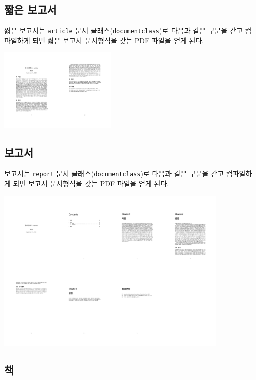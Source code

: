 \documentclass[
  letterpaper,
]{book}
\begin{document}
\hypertarget{uxc9e7uxc740-uxbcf4uxace0uxc11c}{%
\subsection{짧은 보고서}\label{uxc9e7uxc740-uxbcf4uxace0uxc11c}}

짧은 보고서는 \texttt{article} 문서 클래스(\texttt{documentclass})로
다음과 같은 구문을 갇고 컴파일하게 되면 짧은 보고서 문서형식을 갖는 PDF
파일을 얻게 된다.

\includegraphics[width=2.21in,height=\textheight]{document_class_files/figure-pdf/unnamed-chunk-2-1.png}

\hypertarget{uxbcf4uxace0uxc11c}{%
\subsection{보고서}\label{uxbcf4uxace0uxc11c}}

보고서는 \texttt{report} 문서 클래스(\texttt{documentclass})로 다음과
같은 구문을 갇고 컴파일하게 되면 보고서 문서형식을 갖는 PDF 파일을 얻게
된다.

\includegraphics[width=4.39in,height=\textheight]{document_class_files/figure-pdf/unnamed-chunk-3-1.png}

\hypertarget{uxcc45}{%
\subsection{책}\label{uxcc45}}
\end{document}
